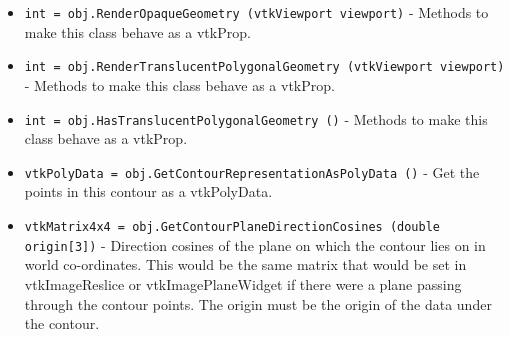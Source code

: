 \begin{itemize}
\item  \verb|int = obj.RenderOpaqueGeometry (vtkViewport viewport)| -  Methods to make this class behave as a vtkProp.

\item  \verb|int = obj.RenderTranslucentPolygonalGeometry (vtkViewport viewport)| -  Methods to make this class behave as a vtkProp.

\item  \verb|int = obj.HasTranslucentPolygonalGeometry ()| -  Methods to make this class behave as a vtkProp.

\item  \verb|vtkPolyData = obj.GetContourRepresentationAsPolyData ()| -  Get the points in this contour as a vtkPolyData. 

\item  \verb|vtkMatrix4x4 = obj.GetContourPlaneDirectionCosines (double origin[3])| -  Direction cosines of the plane on which the contour lies
 on in world co-ordinates. This would be the same matrix that would be
 set in vtkImageReslice or vtkImagePlaneWidget if there were a plane
 passing through the contour points. The origin must be the origin of the 
 data under the contour.

\end{itemize}
